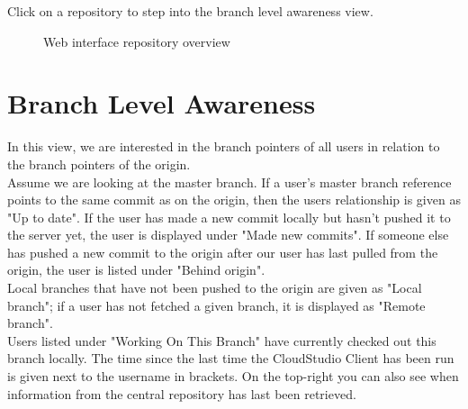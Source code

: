 Click on a repository to step into the branch level awareness view.



\begin{figure}[h!]
  \centering
  \caption{Web interface repository overview}
  \label{fig:overview}
\end{figure}





\section{Branch Level Awareness}

In this view, we are interested in the branch pointers of all users in relation to the branch pointers of the origin. \\

Assume we are looking at the master branch. If a user's master branch reference points to the same commit as on the origin, then the users relationship is given as "Up to date". If the user has made a new commit locally but hasn't pushed it to the server yet, the user is displayed under "Made new commits". If someone else has pushed a new commit to the origin after our user has last pulled from the origin, the user is listed under "Behind origin". \\

Local branches that have not been pushed to the origin are given as "Local branch"; if a user has not fetched a given branch, it is displayed as "Remote branch". \\

Users listed under "Working On This Branch" have currently checked out this branch locally. The time since the last time the CloudStudio Client has been run is given next to the username in brackets. On the top-right you can also see when information from the central repository has last been retrieved. \\

